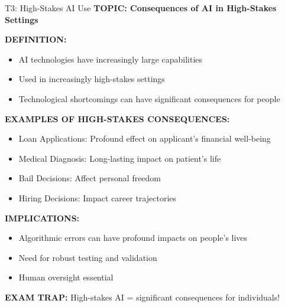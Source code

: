 \documentclass[8pt]{beamer}
\begin{document}
	\begin{frame}{T3: High-Stakes AI Use}
		\fontsize{6.5}{7.5}\selectfont
		\textbf{TOPIC: Consequences of AI in High-Stakes Settings}
		
		\vspace{0.1cm}
		\textbf{DEFINITION:}
		\begin{itemize}
			\item AI technologies have increasingly large capabilities
			\item Used in increasingly high-stakes settings
			\item Technological shortcomings can have significant consequences for people
		\end{itemize}
		
		\vspace{0.1cm}
		\textbf{EXAMPLES OF HIGH-STAKES CONSEQUENCES:}
		\begin{itemize}
			\item \textcolor{myblue}{Loan Applications:} Profound effect on applicant's financial well-being
			\item \textcolor{myblue}{Medical Diagnosis:} Long-lasting impact on patient's life
			\item \textcolor{myblue}{Bail Decisions:} Affect personal freedom
			\item \textcolor{myblue}{Hiring Decisions:} Impact career trajectories
		\end{itemize}
		
		\vspace{0.1cm}
		\textbf{IMPLICATIONS:}
		\begin{itemize}
			\item Algorithmic errors can have profound impacts on people's lives
			\item Need for robust testing and validation
			\item Human oversight essential
		\end{itemize}
		
		\textcolor{myred}{\textbf{EXAM TRAP:}} High-stakes AI = \textcolor{myblue}{significant consequences for individuals}!
	\end{frame}
	
\end{document}
